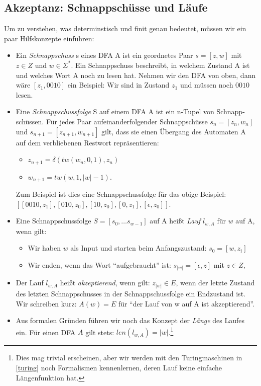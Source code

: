 \subsection{Akzeptanz: Schnappschüsse und Läufe}
Um zu verstehen, was determinstisch und finit genau bedeutet,
müssen wir ein paar Hilfskonzepte einführen:
\begin{itemize}
    \item Ein \emph{Schnappschuss} s eines DFA A ist ein geordnetes Paar $s = [z, w]$
        mit $z \in Z$ und $w \in \Sigma^*$.
        Ein Schnappschuss beschreibt,
        in welchem Zustand A ist und welches Wort A noch zu lesen hat.
        Nehmen wir den DFA von oben, dann wäre $[z_1,0010]$ ein Beispiel:
        Wir sind in Zustand $z_1$ und müssen noch $0010$ lesen.
    \item Eine \emph{Schnappschussfolge} S auf einem DFA A
        ist ein n-Tupel von Schnapp-schüssen. 
        Für jedes Paar aufeinanderfolgender Schnappschüsse $s_n = [z_n, w_n]$
        und $s_{n+1} = [z_{n+1}, w_{n+1}]$ gilt,
        dass sie einen Übergang des Automaten A auf dem verbliebenen Restwort repräsentieren:
        \begin{itemize}
            \item $z_{n+1} = \delta(tw(w_{n},0,1), z_n)$
            \item $w_{n+1} = tw(w,1,|w|-1)$.
        \end{itemize}
        Zum Beispiel ist dies eine Schnappschussfolge für das obige Beispiel:\linebreak
        $[[0010,z_1],[010, z_0],[10, z_0],[0,z_1],[\epsilon,z_0]]$.
    \item Eine Schnappschussfolge $S = [s_0, \ldots s_{w-1}]$ auf A
        heißt \emph{Lauf} $l_{w,A}$ für $w$ auf A, wenn gilt:
        \begin{itemize}
            \item Wir haben $w$ als Input und starten beim Anfangszustand:
                $s_0 = [w,z_i]$ 
            \item Wir enden, wenn das Wort ``aufgebraucht'' ist:
                $s_{|w|} = [\epsilon, z]$ mit $z \in Z$,

        \end{itemize}
    \item Der Lauf $l_{w,A}$ heißt \emph{akzeptierend}, wenn gilt:
        $z_{|w|} \in E$,
        wenn der letzte Zustand des letzten Schnappschusses in der Schnappschussfolge
        ein Endzustand ist.
        Wir schreiben kurz: $A(w) = E$
        für ``der Lauf von w auf A ist akzeptierend''. 
    \item Aus formalen Gründen führen wir noch das Konzept der \emph{Länge} des Laufes ein.
        Für einen DFA $A$ gilt stets: $len(l_{w,A}) = |w|$.\footnote{
        Dies mag trivial erscheinen,
        aber wir werden mit den Turingmaschinen in \autoref{turing} 
        noch Formalismen kennenlernen, deren Lauf keine einfache Längenfunktion hat.} 

\end{itemize}

